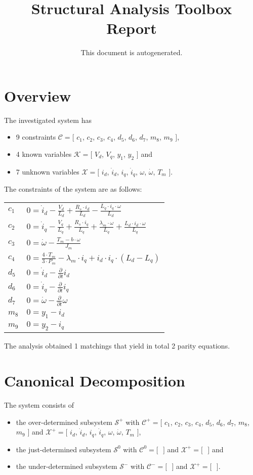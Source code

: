 \documentclass[a4,11pt]{article}
\title{Structural Analysis Toolbox Report}
\author{This document is autogenerated.}
\begin{document}
\maketitle
\section{Overview}
The investigated system has
\begin{itemize}
	\item 9 constraints $\mathcal{C} = [$ $c_1$, $c_2$, $c_3$, $c_4$, $d_5$, $d_6$, $d_7$, $m_8$, $m_9$ $]$,
	\item 4 known variables $\mathcal{K} = [$ $V_d$, $V_q$, $y_1$, $y_2$ $]$ and
	\item 7 unknown variables $\mathcal{X} = [$ $i_d$, $\dot{i}_d$, $i_q$, $\dot{i}_q$, $\omega$, $\dot{\omega}$, $T_m$ $]$.
\end{itemize}
The constraints of the system are as follows:
\begin{longtable}{ l | p{} }
	$c_1$ & $ 0=\dot{i}_d-\frac{V_d}{L_d}+\frac{R_s\cdot i_d}{L_d}-\frac{L_q\cdot i_q\cdot \omega}{L_d} $ \\
	$c_2$ & $ 0=\dot{i}_q-\frac{V_q}{L_q}+\frac{R_s\cdot i_q}{L_q}+\frac{\lambda_m\cdot \omega}{L_q}+\frac{L_d\cdot i_d\cdot \omega}{L_q} $ \\
	$c_3$ & $ 0=\dot{\omega}-\frac{T_m-b\cdot \omega}{J_m} $ \\
	$c_4$ & $ 0=\frac{4\cdot T_m}{3\cdot P_m}-\lambda_m\cdot i_q+i_d\cdot i_q\cdot \left(L_d-L_q\right) $ \\
	$d_5$ & $ 0=\dot{i}_d-\frac{\partial }{\partial t} i_d $ \\
	$d_6$ & $ 0=\dot{i}_q-\frac{\partial }{\partial t} i_q $ \\
	$d_7$ & $ 0=\dot{\omega}-\frac{\partial }{\partial t} \omega $ \\
	$m_8$ & $ 0=y_1-i_d $ \\
	$m_9$ & $ 0=y_2-i_q $ \\
\end{longtable}
The analysis obtained 1 matchings that yield in total 2 parity equations.\newpage
\section{Canonical Decomposition}The system consists of
\begin{itemize}	\item the over-determined subsystem $\mathcal{S}^+$ with $\mathcal{C}^+ = [$ $c_1$, $c_2$, $c_3$, $c_4$, $d_5$, $d_6$, $d_7$, $m_8$, $m_9 $ $]$ and $\mathcal{X}^+ = [$ $i_d$, $\dot{i}_d$, $i_q$, $\dot{i}_q$, $\omega$, $\dot{\omega}$, $T_m $ $]$,
	\item the just-determined subsystem $\mathcal{S}^0$ with $\mathcal{C}^0 = [$ $ $ $]$ and $\mathcal{X}^+ = [$ $ $ $]$ and
	\item the under-determined subsystem $\mathcal{S}^-$ with $\mathcal{C}^- = [$ $ $ $]$ and $\mathcal{X}^+ = [$ $ $ $]$.
\end{itemize}
\end{document}
